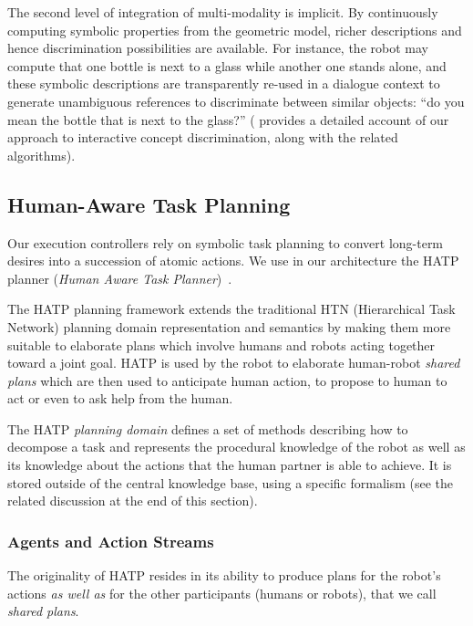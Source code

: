 \documentclass[preprint,3p,times]{elsarticle}
\begin{document}
The second level of integration of multi-modality is implicit. By continuously
computing symbolic properties from the geometric model, richer descriptions and
hence discrimination possibilities are available. For instance, the robot may
compute that one bottle is next to a glass while another one stands alone, and
these symbolic descriptions are transparently re-used in a dialogue context to
generate unambiguous references to discriminate between similar objects: ``do
you mean the bottle that is next to the glass?'' (\cite{Ros2010b} provides a
detailed account of our approach to interactive concept discrimination, along
with the related algorithms).


\subsection{Human-Aware Task Planning}
\label{hatp}

Our execution controllers rely on symbolic task planning to convert long-term
desires into a succession of atomic actions. We use in our architecture the HATP
planner (\emph{Human Aware Task Planner})~\cite{Alili2008,
Alili2009,Lallement2014}.

The HATP planning framework extends the
traditional HTN (Hierarchical Task Network) planning domain representation and
semantics by making them more suitable to elaborate plans which involve humans
and robots acting together toward a joint goal. HATP is used by the robot to
elaborate human-robot \emph{shared plans} which are then used to anticipate
human action, to propose to human to act or even to ask help from the human.

The HATP \emph{planning domain} defines a set of methods describing how to
decompose a task and represents the procedural knowledge of the robot as well as
its knowledge about the actions that the human partner is able to achieve. It is
stored outside of the central knowledge base, using a specific formalism (see
the related discussion at the end of this section).

\subsubsection{Agents and Action Streams}

The originality of HATP resides in its ability to produce plans for the robot's
actions \emph{as well as} for the other participants (humans or robots), that we
call \emph{shared plans}. 
\end{document}
